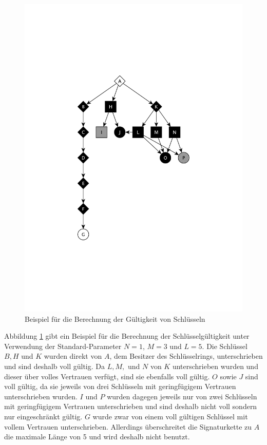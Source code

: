 \begin{figure}[t]
  \centering
  \includegraphics[scale=0.7]{images/trust-beispiel.pdf}
  \caption{Beispiel für die Berechnung der Gültigkeit von Schlüsseln}
  \label{fig:trust-beispiel}
\end{figure}

Abbildung \ref{fig:trust-beispiel} gibt ein Beispiel für die
Berechnung der Schlüsselgültigkeit unter Verwendung der
Standard-Parameter $N=1$, $M=3$ und $L=5$. Die Schlüssel $B, H$ und
$K$ wurden direkt von $A$, dem Besitzer des Schlüsselrings,
unterschrieben und sind deshalb voll gültig. Da $L, M,$ und $N$ von
$K$ unterschrieben wurden und dieser über volles Vertrauen verfügt,
sind sie ebenfalls voll gültig. $O$ sowie $J$ sind voll gültig, da sie
jeweils von drei Schlüsseln mit geringfügigem Vertrauen unterschrieben
wurden. $I$ und $P$ wurden dagegen jeweils nur von zwei Schlüsseln mit
geringfügigem Vertrauen unterschrieben und sind deshalb nicht voll
sondern nur eingeschränkt gültig. $G$ wurde zwar von einem voll
gültigen Schlüssel mit vollem Vertrauen unterschrieben. Allerdings
überschreitet die Signaturkette zu $A$ die maximale Länge von 5 und
wird deshalb nicht benutzt.

